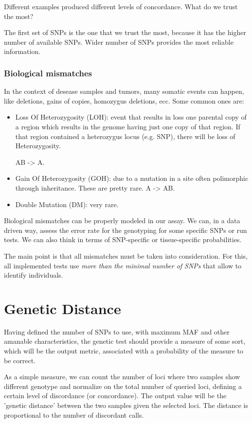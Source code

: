 Different examples produced different levels of concordance. What do we trust
the most?

The first set of SNPs is the one that we trust the most, because it has the
higher number of available SNPs. Wider number of SNPs provides the most reliable
information. 

\subsubsection{Biological mismatches}

In the context of desease samples and tumors, many somatic events can happen,
like deletions, gains of copies, homozygus deletions, ecc. Some common ones are:
\begin{itemize}
	\item  Loss Of Heterozygosity (LOH):  event that results in loss one
	parental copy of a region which results in the genome having just one copy
	of that region. If that region contained a heterozygus locus (e.g. SNP),
	there will be loss of Heterozygosity.  
	
	AB -> A.
	\item Gain Of Heterozygosity (GOH): due to a mutation in a site often
	polimorphic through inheritance. These are pretty rare. A -> AB. 
	\item Double Mutation (DM): very rare.  
\end{itemize}

\bigskip
Biological mismatches can be properly modeled in our assay. We can, in a data
driven way, assess the error rate for the genotyping for some specific SNPs or
run tests. We can also think in terms of SNP-specific or tissue-specific
probabilities.

The main point is that all mismatches must be taken into consideration. For
this, all implemented tests use \emph{more than the minimal number of SNPs} that
allow to identify individuals. 


\section{Genetic Distance}

Having defined the number of SNPs to use, with maximum MAF and other amanable
characteristics, the genetic test should provide a measure of some sort, which
will be the output metric, associated with a probability of the measure to be
correct. 

As a simple measure, we can count the number of loci where two samples show
different genotype and normalize on the total number of queried loci, defining a
certain level of discordance (or concordance). The output value will be the
'genetic distance' between the two samples given the selected loci. The distance
is proportional to the number of discordant calls.


